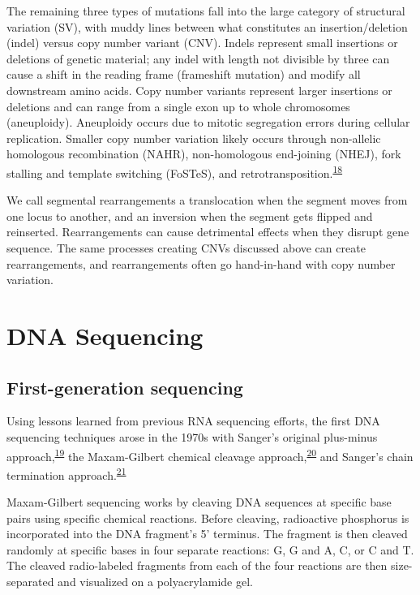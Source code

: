 \documentclass[11pt,letterpaper,oneside]{book}
\begin{document}
The remaining three types of mutations fall into the large category of structural variation (SV), with muddy lines between what constitutes an insertion/deletion (indel) versus copy number variant (CNV).
Indels represent small insertions or deletions of genetic material; any indel with length not divisible by three can cause a shift in the reading frame (frameshift mutation) and modify all downstream amino acids.
Copy number variants represent larger insertions or deletions and can range from a single exon up to whole chromosomes (aneuploidy).
Aneuploidy occurs due to mitotic segregation errors during cellular replication.
Smaller copy number variation likely occurs through non-allelic homologous recombination (NAHR), non-homologous end-joining (NHEJ), fork stalling and template switching (FoSTeS), and retrotransposition.\textsuperscript{\protect\hyperlink{ref-gu:2008aa}{18}}

We call segmental rearrangements a translocation when the segment moves from one locus to another, and an inversion when the segment gets flipped and reinserted.
Rearrangements can cause detrimental effects when they disrupt gene sequence.
The same processes creating CNVs discussed above can create rearrangements, and rearrangements often go hand-in-hand with copy number variation.

\hypertarget{sequencing}{%
\section{DNA Sequencing}\label{sequencing}}

\hypertarget{firstGen}{%
\subsection{First-generation sequencing}\label{firstGen}}

Using lessons learned from previous RNA sequencing efforts, the first DNA sequencing techniques arose in the 1970s with Sanger's original plus-minus approach,\textsuperscript{\protect\hyperlink{ref-sanger:1975aa}{19}} the Maxam-Gilbert chemical cleavage approach,\textsuperscript{\protect\hyperlink{ref-maxam:1977aa}{20}} and Sanger's chain termination approach.\textsuperscript{\protect\hyperlink{ref-sanger:1977aa}{21}}

Maxam-Gilbert sequencing works by cleaving DNA sequences at specific base pairs using specific chemical reactions.
Before cleaving, radioactive phosphorus is incorporated into the DNA fragment's 5' terminus.
The fragment is then cleaved randomly at specific bases in four separate reactions: G, G and A, C, or C and T.
The cleaved radio-labeled fragments from each of the four reactions are then size-separated and visualized on a polyacrylamide gel.
\end{document}
